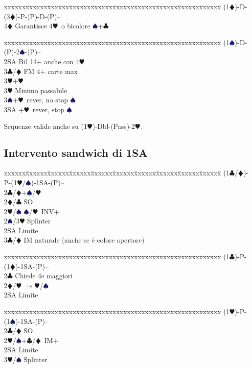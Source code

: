 \documentclass[a4paper,italian]{article}
\newcommand{\BC}{\textcolor{OliveGreen}{$\clubsuit$}}
\newcommand{\BD}{\textcolor{RedOrange}{$\vardiamondsuit$}}
\newcommand{\BH}{\textcolor{Red2}{$\varheartsuit${}}}
\newcommand{\BS}{\textcolor{MidnightBlue}{$\spadesuit${}}}
\newenvironment{bidtable}
{\begin{tabbing}

    xxxxxx\=xxxxxx\=xxxxxx\=xxxxxx\=xxxxxx\=xxxxxx\=xxxxxx\=xxxxxx\=xxxxxx\=xxxxxx\=\kill}
{\end{tabbing} }%
\begin{document}
\begin{multicols}{2}
    \begin{bidtable}
        (1\BD)-D-(3\BD)-P-(P)-D-(P)--\+\\
        4\BD \> Garantisce 4\BH\ o bicolore \BS +\BC \-
    \end{bidtable}

    \begin{bidtable}
        (1\BS)-D-(P)-2\BS-(P)--\+\\
        2SA \> Bil 14+ anche con 4\BH \\
        3\BC/\BD \> FM 4+ carte max\+\\
        3\BH {}+\BH \-\\
        3\BH \> Minimo passabile\\
        3\BS {}+\BH\ rever, no stop \BS\\
        3SA +\BH\ rever, stop \BS\-
    \end{bidtable}

    Sequenze valide anche su (1\BH )-Dbl-(Pass)-2\BH.

    \subsection{Intervento sandwich di 1SA}

    \begin{bidtable}
        (1\BC/\BD)-P-(1\BH/\BS)-1SA-(P)--\+\\
        2\BC/\BD{}+\BS/\BH\\
        2\BD/\BC\> SO\\
        2\BH/\BS{} \BS/\BH\ INV+\\
        2\BS/3\BH\> Splinter\\
        2SA\> Limite\\
        3\BC/\BD\> IM naturale (anche se è colore apertore)
    \end{bidtable}
    \begin{bidtable}
        (1\BC)-P-(1\BD)-1SA-(P)--\+\\
        2\BC\> Chiede 4e maggiori\\
        2\BD/\BH\> $\Rightarrow$\BH/\BS\\
        2SA\> Limite\-
    \end{bidtable}
    \begin{bidtable}
        (1\BH)-P-(1\BS)-1SA-(P)--\+\\
        2\BC/\BD\> SO\\
        2\BH/\BS{}+\BC/\BD\ IM+\\
        2SA\> Limite\\
        3\BH/\BS\> Splinter
    \end{bidtable}
    \vfill\null
    \columnbreak


\end{multicols}
\end{document}
